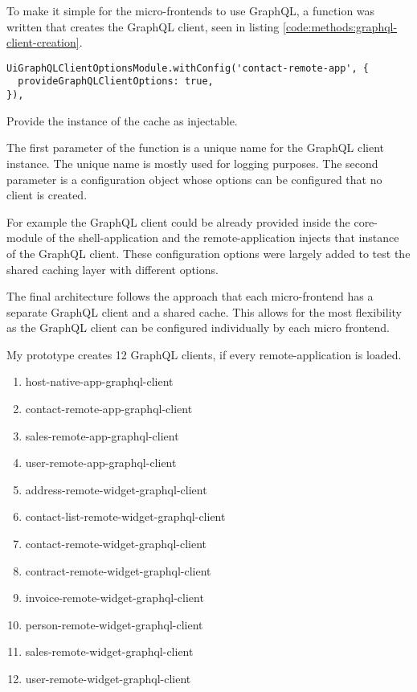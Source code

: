 To make it simple for the micro-frontends to use GraphQL, a function was written that creates the GraphQL client, seen in listing \ref{code:methods:graphql-client-creation}.

\ifshowListings
\begin{listing}[H]
\begin{verbatim}
UiGraphQLClientOptionsModule.withConfig('contact-remote-app', {
  provideGraphQLClientOptions: true,
}),
\end{verbatim}
\caption{Provide the instance of the cache as injectable.}\label{code:methods:graphql-client-creation}
\end{listing}
\fi

The first parameter of the function is a unique name for the GraphQL client instance. The unique name is mostly used for logging purposes. The second parameter is a configuration object whose options can be configured that no client is created.

For example the GraphQL client could be already provided inside the core-module of the shell-application and the remote-application injects that instance of the GraphQL client. These configuration options were largely added to test the shared caching layer with different options.

The final architecture follows the approach that each micro-frontend has a separate GraphQL client and a shared cache. This allows for the most flexibility as the GraphQL client can be configured individually by each micro frontend.


My prototype creates 12 GraphQL clients, if every remote-application is loaded.

\begin{enumerate}
  \item host-native-app-graphql-client
  \item contact-remote-app-graphql-client
  \item sales-remote-app-graphql-client
  \item user-remote-app-graphql-client
  \item address-remote-widget-graphql-client
  \item contact-list-remote-widget-graphql-client
  \item contact-remote-widget-graphql-client
  \item contract-remote-widget-graphql-client
  \item invoice-remote-widget-graphql-client
  \item person-remote-widget-graphql-client
  \item sales-remote-widget-graphql-client
  \item user-remote-widget-graphql-client
\end{enumerate}

